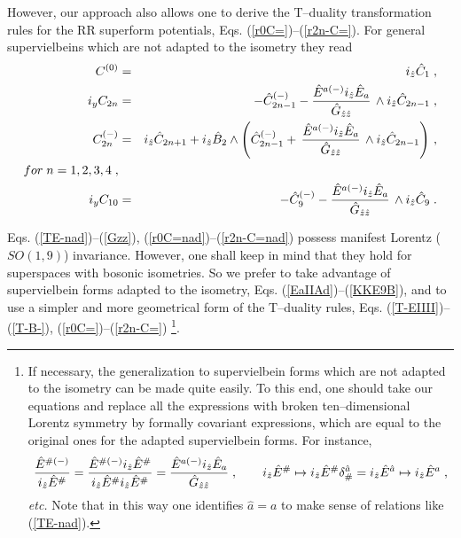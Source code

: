 \documentclass[a4paper,11pt]{article}
\begin{document}
However, our approach also allows one to derive the  T--duality 
transformation rules for the 
RR superform potentials, Eqs. (\ref{r0C=})--(\ref{r2n-C=}).   
For general supervielbeins which are not adapted to the isometry they 
read
\begin{eqnarray}
\label{r0C=nad}
C^{(0)} &=&  i_{\hat{z}}\hat{C}_1 \; ,
\\ \label{r2nyC=nad}
i_{y}C_{2n}  &=& - \hat{C}^{(-)}_{2n-1} -
{\hat{E}^{a(-)}i_{\hat{z}}\hat{E}_a
\over \hat{G}_{\hat{z}\hat{z}}}
\, \wedge
i_{\hat{z}} \hat{C}_{2n-1}  \; ,
\\ \label{r2n-C=nad}
C^{(-)}_{2n}
&=& i_{\hat{z}}\hat{C}_{2n+1} +
i_{\hat{z}} \hat{B}_2 \wedge
\left(\hat{C}^{(-)}_{2n-1} + \, {\hat{E}^{a(-)}i_{\hat{z}}\hat{E}_a
\over \hat{G}_{\hat{z}\hat{z}}} \,
\wedge
i_{\hat{z}} \hat{C}_{2n-1} \right)\, , 
\\ 
\nonumber for \; n=1,2,3,4 \; , 
\\ \label{r10C=nad}
i_{y}C_{10}  &=& - \hat{C}^{(-)}_{9} -
{\hat{E}^{a(-)}i_{\hat{z}}\hat{E}_a
\over \hat{G}_{\hat{z}\hat{z}}}
\, \wedge
i_{\hat{z}} \hat{C}_{9}  \; .
\end{eqnarray} 

Eqs. (\ref{TE-nad})--(\ref{Gzz}), (\ref{r0C=nad})--(\ref{r2n-C=nad})  
possess manifest  Lorentz ($SO(1,9)$) invariance. However, 
one shall keep in mind that they hold for superspaces 
with bosonic isometries. So we prefer to take  
advantage of  supervielbein forms 
adapted to the isometry, Eqs. (\ref{EaIIAd})--(\ref{KKE9B}), 
and to use a simpler and more geometrical form of the T--duality rules, 
Eqs. (\ref{T-EIIII})--(\ref{T-B-}),  (\ref{r0C=})--(\ref{r2n-C=})
\footnote{
If necessary, the generalization to supervielbein forms which are not 
adapted to the isometry can be made quite easily. To this end, 
one should take our equations and replace all the expressions with 
broken ten--dimensional 
Lorentz symmetry by  formally covariant expressions, which are 
equal to the original ones for the adapted supervielbein forms. For instance, 
$$ {\hat{E}^{\# (-)} \over i_{\hat{z}} \hat{E}^{\#}}= 
{\hat{E}^{\# (-)} i_{\hat{z}} \hat{E}^{\#}\over i_{\hat{z}} \hat{E}^{\#}
i_{\hat{z}} \hat{E}^{\#}}= {\hat{E}^{a (-)} i_{\hat{z}} \hat{E}_{a}\over 
\hat{G}_{\hat{z}\hat{z}}}\; , \qquad 
i_{\hat{z}} \hat{E}^{\#} 
\mapsto i_{\hat{z}} \hat{E}^{\#}\delta_{\#}^{\hat{a}}
= i_{\hat{z}} \hat{E}^{\hat{a}}\mapsto  i_{\hat{z}} \hat{E}^{{a}}\; , $$ 
{\it etc.}
Note that in this way one identifies $\hat{a}=a$ to make sense of 
relations like (\ref{TE-nad}).}.
\end{document}
